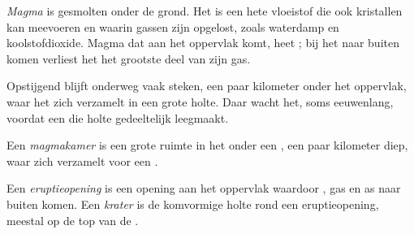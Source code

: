 \begin{definition}[Magma]\label{def:g7:volcanoes:magma}
\emph{Magma} is gesmolten  onder de grond. Het is een
hete vloeistof die ook kristallen kan meevoeren en waarin gassen zijn
opgelost, zoals waterdamp en koolstofdioxide. Magma dat aan het oppervlak
komt, heet ; bij het naar buiten komen verliest het het grootste deel
van zijn gas.
\end{definition}

Opstijgend  blijft onderweg vaak steken, een paar kilometer onder het
oppervlak, waar het zich verzamelt in een grote holte. Daar wacht het,
soms eeuwenlang, voordat een  die holte gedeeltelijk leegmaakt.

\begin{definition}[Magmakamer]\label{def:g7:volcanoes:magma-chamber}
Een \emph{magmakamer} is een grote ruimte in het 
onder een , een paar kilometer diep, waar  zich verzamelt voor
een .
\end{definition}

\begin{definition}\label{def:g7:volcanoes:vent}
Een \emph{eruptieopening} is een opening aan het
oppervlak waardoor , gas en as naar buiten komen. Een
\emph{krater} is de komvormige holte rond een eruptieopening,
meestal op de top van de .
\end{definition}

